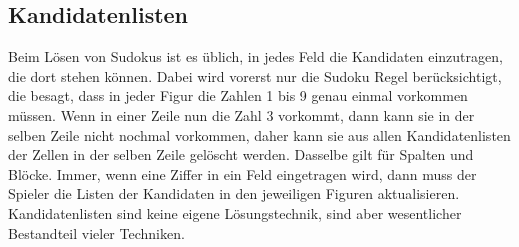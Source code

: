\subsection{Kandidatenlisten}
\label{Kandidatenlisten}
Beim Lösen von Sudokus ist es üblich, in jedes Feld die Kandidaten einzutragen, die dort stehen können. Dabei wird vorerst nur die Sudoku Regel berücksichtigt, die besagt, dass in jeder Figur die Zahlen 1 bis 9 genau einmal vorkommen müssen. Wenn in einer Zeile nun die Zahl 3 vorkommt, dann kann sie in der selben Zeile nicht nochmal vorkommen, daher kann sie aus allen Kandidatenlisten der Zellen in der selben Zeile gelöscht werden. Dasselbe gilt für Spalten und Blöcke. Immer, wenn eine Ziffer in ein Feld eingetragen wird, dann muss der Spieler die Listen der Kandidaten in den jeweiligen Figuren aktualisieren.\\
Kandidatenlisten sind keine eigene Lösungstechnik, sind aber wesentlicher Bestandteil vieler Techniken.